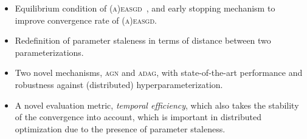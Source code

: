 \begin{itemize}
\item Equilibrium condition of \textsc{(a)easgd}~\cite{zhang2015deep}, and early stopping mechanism to improve convergence rate of \textsc{(a)easgd}.
\item Redefinition of parameter staleness in terms of distance between two parameterizations.
\item Two novel mechanisms, \textsc{agn} and \textsc{adag}, with state-of-the-art performance and robustness against (distributed) hyperparameterization.
\item A novel evaluation metric, \emph{temporal efficiency}, which also takes the stability of the convergence into account, which is important in distributed optimization due to the presence of parameter staleness.
\end{itemize}

